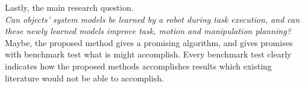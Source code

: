 Lastly, the main research question. \\

\textit{Can objects’ system models be learned by a robot during task execution, and can these newly learned models improve task, motion and manipulation planning?} Maybe, the proposed method gives a promising algorithm, and gives promises with benchmark test what is might accomplish. Every benchmark test clearly indicates how the proposed methods accomplishes results which existing literature would not be able to accomplish. 


